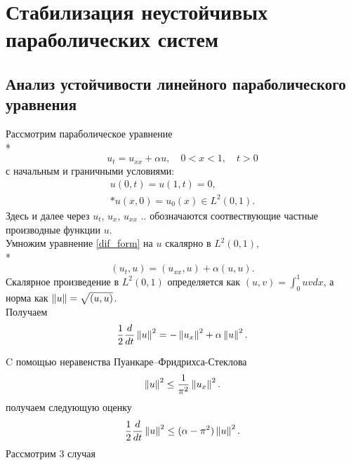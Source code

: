 \section{Стабилизация неустойчивых параболических систем}

\subsection{Анализ устойчивости линейного параболического уравнения}
Рассмотрим параболическое уравнение \\*
\begin{equation}\label{dif_form}
u_t = u_{xx} + \alpha u, \quad 0 < x < 1, \quad t > 0
\end{equation}
с начальным и граничными условиями:
\begin{gather}\label{d_control}
u(0, t) = u(1, t) = 0, \\*
u(x, 0) = u_{0}(x) \in L^2(0, 1). \nonumber
\end{gather}
Здесь и далее через $u_t$, $u_x$, $u_{xx}$ .. обозначаются соотвествующие частные производные функции $u$.\\
Умножим уравнение \eqref{dif_form} на $u$ скалярно в $L^2(0, 1)$,\\*
\begin{equation*}
(u_t, u) = (u_{xx}, u) + \alpha (u, u).
\end{equation*}
Скалярное произведение в $L^2(0, 1)$ определяется как $(u, v) = \int_0^1 uv dx$, а норма как $\left\lVert u\right\rVert = \sqrt{(u, u)}$.\\
Получаем 
\begin{equation}\label{int_form}
\frac{1}{2}\frac{d}{dt}\left\lVert u\right\rVert^2 = -\left\lVert u_x\right\rVert^2 + \alpha \left\lVert u\right\rVert^2.
\end{equation}


C помощью неравенства Пуанкаре–Фридрихса-Стеклова
\begin{equation*}
\left\lVert u\right\rVert^2 \le \frac{1}{\pi^2} \left\lVert u_x\right\rVert^2.
\end{equation*}
получаем следующую оценку 
\begin{equation}\label{stable_opr}
\frac{1}{2}\frac{d}{dt}\left\lVert u\right\rVert^2 \le (\alpha - \pi^2)\left\lVert u\right\rVert^2.
\end{equation}
Рассмотрим 3 случая

